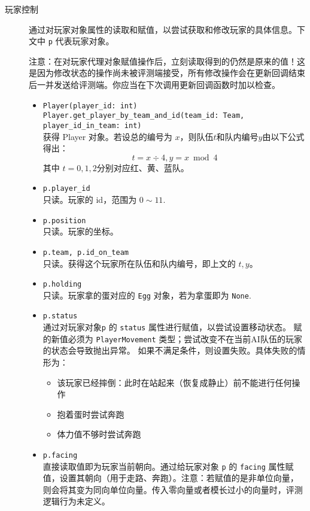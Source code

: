 \documentclass{article}
\begin{document}
\begin{description}
\item[玩家控制] 通过对玩家对象属性的读取和赋值，以尝试获取和修改玩家的具体信息。下文中 \lstinline{p} 代表玩家对象。

注意：在对玩家代理对象赋值操作后，立刻读取得到的仍然是原来的值！这是因为修改状态的操作尚未被评测端接受，所有修改操作会在更新回调结束后一并发送给评测端。你应当在下次调用更新回调函数时加以检查。
\begin{itemize}
	\item
  \lstinline{Player(player_id: int)}\\
  \lstinline{Player.get_player_by_team_and_id(team_id: Team, player_id_in_team: int)}\\[-2pt]
获得 Player 对象。若设总的编号为 $x$，则队伍$t$和队内编号$y$由以下公式得出：
\[t = x \div 4, y = x \bmod 4\]
其中 $t=0,1,2$分别对应红、黄、蓝队。

\item \lstinline{p.player_id}\\[-2pt]
只读。玩家的 id，范围为 $0 \sim 11$.

\item \lstinline{p.position}\\[-2pt]
只读。玩家的坐标。

\item \lstinline{p.team, p.id_on_team}\\[-2pt]
只读。获得这个玩家所在队伍和队内编号，即上文的 $t, y$。

\item \lstinline{p.holding}\\[-2pt]
只读。玩家拿的蛋对应的 \lstinline{Egg} 对象，若为拿蛋即为 \lstinline{None}.

\item
\lstinline{p.status}\\[-2pt]
通过对玩家对象\lstinline{p} 的 \lstinline{status} 属性进行赋值，以尝试设置移动状态。
赋的新值必须为 \lstinline{PlayerMovement} 类型；尝试改变不在当前AI队伍的玩家的状态会导致抛出异常。
如果不满足条件，则设置失败。具体失败的情形为：
\begin{itemize}\setlength\itemsep{0em}
\item 该玩家已经摔倒：此时在站起来（恢复成静止）前不能进行任何操作
\item 抱着蛋时尝试奔跑
\item 体力值不够时尝试奔跑
\end{itemize}

\item
\lstinline{p.facing}\\[-2pt]
直接读取值即为玩家当前朝向。通过给玩家对象 \lstinline{p} 的 \lstinline{facing} 属性赋值，设置其朝向（用于走路、奔跑）。注意：若赋值的是非单位向量，则会将其变为同向单位向量。传入零向量或者模长过小的向量时，评测逻辑行为未定义。


\end{itemize}
\end{description}
\end{document}
